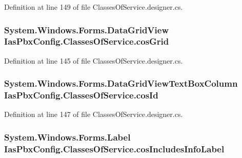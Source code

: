 Definition at line 149 of file ClassesOfService.designer.cs.\hypertarget{class_ias_pbx_config_1_1_classes_of_service_a19d5713eed8f1042f28a0e5ea5ed6071}{
\subsubsection[{cosGrid}]{\setlength{\rightskip}{0pt plus 5cm}System.Windows.Forms.DataGridView {\bf IasPbxConfig.ClassesOfService.cosGrid}}}
\label{class_ias_pbx_config_1_1_classes_of_service_a19d5713eed8f1042f28a0e5ea5ed6071}


Definition at line 145 of file ClassesOfService.designer.cs.\hypertarget{class_ias_pbx_config_1_1_classes_of_service_a6f26462284ed1484ad0fb62dd6c82975}{
\subsubsection[{cosId}]{\setlength{\rightskip}{0pt plus 5cm}System.Windows.Forms.DataGridViewTextBoxColumn {\bf IasPbxConfig.ClassesOfService.cosId}}}
\label{class_ias_pbx_config_1_1_classes_of_service_a6f26462284ed1484ad0fb62dd6c82975}


Definition at line 147 of file ClassesOfService.designer.cs.\hypertarget{class_ias_pbx_config_1_1_classes_of_service_abfacee229a02347e3b82a912d417ede2}{
\subsubsection[{cosIncludesInfoLabel}]{\setlength{\rightskip}{0pt plus 5cm}System.Windows.Forms.Label {\bf IasPbxConfig.ClassesOfService.cosIncludesInfoLabel}}}
\label{class_ias_pbx_config_1_1_classes_of_service_abfacee229a02347e3b82a912d417ede2}


